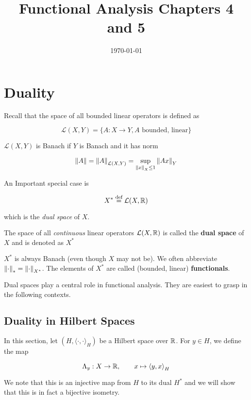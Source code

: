 \documentclass{article}
\title{Functional Analysis Chapters 4 and 5}
\date{\today}
\begin{document}
\author{\aut}
\maketitle

\section{Duality}

Recall that the space of all bounded linear operators is defined as

\[
	\mathcal{L}(X,Y) = \{A: X \to Y, A \textrm{ bounded, linear}\}
\]

\(\mathcal{L}(X,Y)\) is Banach if  \(Y\) is Banach and it has norm

\[
	\left\|{A}\right\| = \left\|{A}\right\|_{\mathcal{L}(X,Y)} = \sup_{\left\|{x}\right\|_X \leq 1} \left\|{Ax}\right\|_Y
\]

An Important special case is

\[
	X^* \overset{\textrm{def}}{=} \mathcal{L}(X,\mathbb{R})
\]

which is the \textit{dual space} of  \(X\).

\begin{definition}\nextline
	The space of all \textit{continuous} linear operators  \(\mathcal{L}(X, \mathbb{R})\) is called the \textbf{dual space} of  \(X\) and is denoted as   \(X^*\)
\end{definition}

\begin{remark}
	\(X^*\) is always Banach (even though  \(X\) may not be). We often abbreviate  \(\left\|{\cdot}\right\|_* = \left\|{\cdot}\right\|_{X^*}\). The elements of  \(X^*\) are called (bounded, linear) \textbf{functionals}.
\end{remark}

Dual spaces play a central role in functional analysis. They are easiest to grasp in the following contexts.

\subsection{Duality in Hilbert Spaces}
In this section, let  \((H, {\langle \cdot, \cdot \rangle}_H )\) be a Hilbert space over  \(\mathbb{R}\). For  \(y\in H\), we define the map

\begin{equation*}
	\Lambda_y: X \to \mathbb{R}, \qquad x \mapsto {\langle y, x \rangle}_H
\end{equation*}

We note that this is an injective map from  \(H\) to its dual  \(H^*\) and we will show that this is in fact a bijective isometry.
\end{document}
